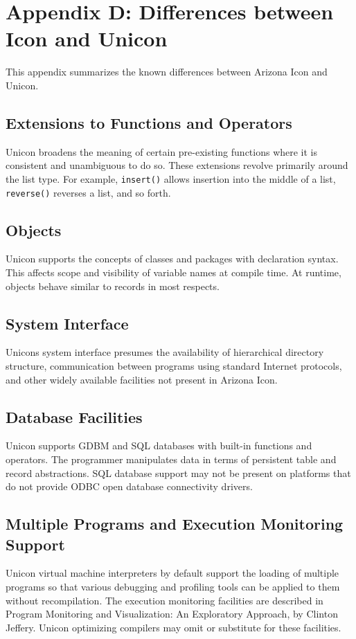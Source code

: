 \clearpage\section{Appendix D: Differences between Icon and Unicon}

This appendix summarizes the known differences between Arizona Icon and
Unicon.

\subsection{Extensions to Functions and Operators}

Unicon broadens the meaning of certain pre-existing functions where it
is consistent and unambiguous to do so. These extensions revolve
primarily around the list type. For example,
\texttt{insert()} allows insertion into the middle of a
list, \texttt{reverse()} reverses a list, and so forth.

\subsection{Objects}

Unicon supports the concepts of classes and packages with declaration
syntax. This affects scope and visibility of variable names at compile
time. At runtime, objects behave similar to records in most respects.

\subsection{System Interface}

Unicon{\textquotesingle}s system interface presumes the availability of
hierarchical directory structure, communication between programs using
standard Internet protocols, and other widely available facilities not
present in Arizona Icon.

\subsection{Database Facilities}

Unicon supports GDBM and SQL databases with
built-in functions and operators. The programmer manipulates data in
terms of persistent table and record abstractions. SQL database support
may not be present on platforms that do not provide ODBC
open database connectivity drivers.

\subsection{Multiple Programs and Execution Monitoring Support}

Unicon virtual machine interpreters by default support the loading of
multiple programs so that various debugging and profiling tools can be
applied to them without recompilation. The execution monitoring
facilities are described in {\textquotedbl}Program Monitoring and
Visualization: An Exploratory Approach{\textquotedbl}, by Clinton
Jeffery. Unicon optimizing compilers may omit or substitute for these
facilities.

\clearpage
\bigskip

